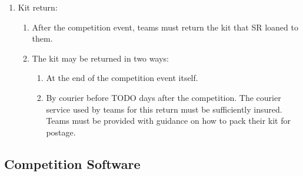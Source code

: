 \begin{enumerate}
\item Kit return:
  \begin{enumerate}
  \item After the competition event, teams must return the kit that SR loaned to them.
  \item The kit may be returned in two ways:
    \begin{enumerate}
    \item At the end of the competition event itself.
    \item By courier before TODO days after the competition.  The courier service used by teams for this return must be sufficiently insured.  Teams must be provided with guidance on how to pack their kit for postage.
    \end{enumerate}
  \end{enumerate}
\end{enumerate}


\subsection{Competition Software}

